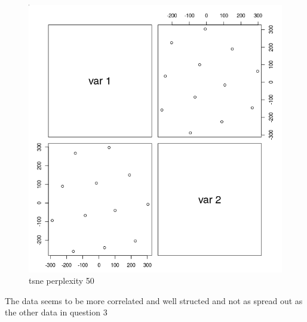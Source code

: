 \documentclass{report}
\begin{document}
\begin{figure}[H]
  \includegraphics[width=\linewidth]{tsne_p_50.png}
  \caption{tsne perplexity 50}
  \label{fig:tsnep50}
\end{figure}

\par
The data seems to be more correlated and well structed and not as spread out as the other data in question 3
\end{document}

